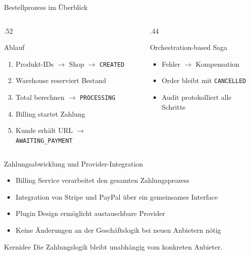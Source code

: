 \documentclass[aspectratio=169,11pt]{beamer}
\begin{document}
\begin{frame}{Bestellprozess im Überblick}
    \begin{columns}[T]
        \begin{column}{.52\textwidth}
            \begin{block}{Ablauf}
                \begin{enumerate}
                    \item Produkt-IDs $\rightarrow$ Shop $\rightarrow$ \texttt{CREATED}
                    \item Warehouse reserviert Bestand
                    \item Total berechnen $\rightarrow$ \texttt{PROCESSING}
                    \item Billing startet Zahlung
                    \item Kunde erhält URL $\rightarrow$ \texttt{AWAITING\_PAYMENT}
                \end{enumerate}
            \end{block}
        \end{column}
        \begin{column}{.44\textwidth}
            \begin{alertblock}{Orchestration-based Saga}
                \begin{itemize}
                    \item Fehler $\rightarrow$ Kompensation
                    \item Order bleibt mit \texttt{CANCELLED}
                    \item Audit protokolliert alle Schritte
                \end{itemize}
            \end{alertblock}
        \end{column}
    \end{columns}
\end{frame}

\begin{frame}{Zahlungsabwicklung und Provider-Integration}
\begin{itemize}
    \item Billing Service verarbeitet den gesamten Zahlungsprozess
    \item Integration von Stripe und PayPal über ein gemeinsames Interface
    \item Plugin Design ermöglicht austauschbare Provider
    \item Keine Änderungen an der Geschäftslogik bei neuen Anbietern nötig
\end{itemize}

\vspace{.3cm}

\begin{block}{Kernidee}
Die Zahlungslogik bleibt unabhängig vom konkreten Anbieter.
\end{block}

\end{frame}
\end{document}

